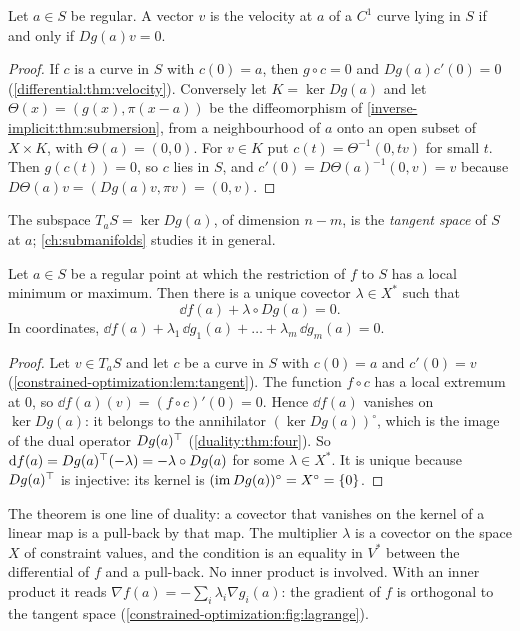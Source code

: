 \begin{notechapter}
\begin{lemma}
\label{constrained-optimization:lem:tangent}
Let $a\in S$ be regular. A vector $v$ is the velocity at $a$ of a $C^1$
curve lying in $S$ if and only if $Dg(a)v = 0$.
\end{lemma}

\begin{proof}
If $c$ is a curve in $S$ with $c(0) = a$, then $g\circ c = 0$ and
$Dg(a)c'(0) = 0$ (\cref{differential:thm:velocity}). Conversely let
$K = \ker Dg(a)$ and let $\Theta(x) = (g(x), \pi(x - a))$ be the
diffeomorphism of \cref{inverse-implicit:thm:submersion}, from a
neighbourhood of $a$ onto an open subset of $X\times K$, with
$\Theta(a) = (0, 0)$. For $v\in K$ put $c(t) = \Theta^{-1}(0, tv)$ for
small $t$. Then $g(c(t)) = 0$, so $c$ lies in $S$, and
$c'(0) = D\Theta(a)^{-1}(0, v) = v$ because
$D\Theta(a)v = (Dg(a)v, \pi v) = (0, v)$.
\end{proof}

The subspace $T_aS = \ker Dg(a)$, of dimension $n - m$, is the
\emph{tangent space} of $S$ at $a$; \cref{ch:submanifolds} studies it in
general.

\begin{theorem}
\label{constrained-optimization:thm:lagrange}
Let $a\in S$ be a regular point at which the restriction of $f$ to $S$
has a local minimum or maximum. Then there is a unique covector
$\lambda\in X^*$ such that
\[
  \dd f(a) + \lambda\circ Dg(a) = 0 .
\]
In coordinates,
$\dd f(a) + \lambda_1\,\dd g_1(a) + \dots + \lambda_m\,\dd g_m(a) = 0$.
\end{theorem}

\begin{proof}
Let $v\in T_aS$ and let $c$ be a curve in $S$ with $c(0) = a$ and
$c'(0) = v$ (\cref{constrained-optimization:lem:tangent}). The function
$f\circ c$ has a local extremum at $0$, so
$\dd f(a)(v) = (f\circ c)'(0) = 0$. Hence $\dd f(a)$ vanishes on
$\ker Dg(a)$: it belongs to the annihilator
$(\ker Dg(a))^\circ$, which is the image of the dual operator
$Dg(a)^{\top}$ (\cref{duality:thm:four}). So
$\mathrm{d} f(a) = Dg(a)^{\top}(-\lambda) = -\lambda\circ Dg(a)$ for some
$\lambda\in X^*$. It is unique because $Dg(a)^{\top}$ is injective: its
kernel is $(\operatorname{im} Dg(a))^\circ = X^\circ = \{0\}$.
\end{proof}

\begin{keyidea}
The theorem is one line of duality: a covector that vanishes on the kernel
of a linear map is a pull-back by that map. The multiplier $\lambda$ is a
covector on the space $X$ of constraint values, and the condition is an
equality in $V^*$ between the differential of $f$ and a pull-back. No
inner product is involved. With an inner product it reads
$\nabla f(a) = -\sum_i\lambda_i\nabla g_i(a)$: the gradient of $f$ is
orthogonal to the tangent space
(\cref{constrained-optimization:fig:lagrange}).
\end{keyidea}


\end{notechapter}
